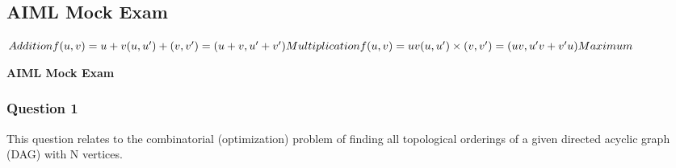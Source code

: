 \subsection{AIML Mock Exam}

\begin{math}
  Addition f(u,v) = u + v \\
  (u,u') + (v,v') = (u+v,u'+v') \\
  Multiplication f(u,v) = uv \\
  (u,u') \times (v,v') = (uv,u'v+v'u) \\
  Maximum \\
\end{math}



\textbf{AIML Mock Exam}

\begin{center}
\end{center}

\subsubsection{Question 1}
This question relates to the combinatorial (optimization) problem of finding all topological orderings of a given directed acyclic graph (DAG) with N vertices.

